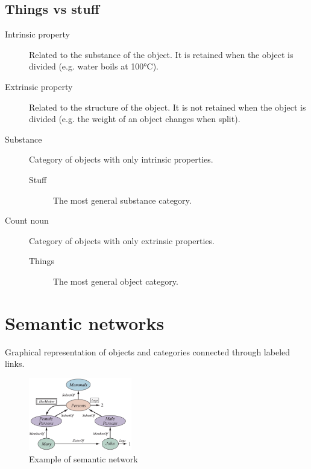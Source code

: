 \subsection{Things vs stuff}

\begin{description}
    \item[Intrinsic property] 
        Related to the substance of the object. It is retained when the object is divided
        (e.g. water boils at 100°C).

    \item[Extrinsic property] 
        Related to the structure of the object. It is not retained when the object is divided
        (e.g. the weight of an object changes when split).

    \item[Substance] 
        Category of objects with only intrinsic properties.

        \begin{description}
            \item[Stuff] 
                The most general substance category.
        \end{description}

    \item[Count noun] 
        Category of objects with only extrinsic properties.

        \begin{description}
            \item[Things] 
                The most general object category.
        \end{description}
\end{description}



\section{Semantic networks}
Graphical representation of objects and categories connected through labeled links.

\begin{figure}[H]
    \centering
    \includegraphics[width=0.4\textwidth]{img/semantic_network.png}
    \caption{Example of semantic network}
\end{figure}


